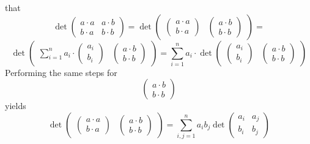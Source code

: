 \documentclass[color=black,11pt]{elegantpaper}
\begin{document}
that
$$
\det\left( \begin{array}{cc}
                                       a\cdot a & a\cdot b \\
                                       b\cdot a & b \cdot b
                                   \end{array}\right) =
 \det\left( \begin{array}{cc}
 \left( \begin{array}{c}
          a\cdot a\\
          b\cdot a
       \end{array} \right)  &
\left( \begin{array}{c}
          a\cdot b\\
          b\cdot b
       \end{array} \right)
                                   \end{array}\right) =
$$
$$
 \det\left( \begin{array}{cc}
\sum_{i=1}^n a_i \cdot
 \left( \begin{array}{c}
                a_i\\
                b_i
     \end{array} \right) &
\left( \begin{array}{c}
          a\cdot b\\
          b\cdot b
       \end{array} \right)
                                   \end{array}\right) = \sum_{i=1}^n a_i \cdot  \det\left( \begin{array}{cc}
 \left( \begin{array}{c}
                a_i\\
                b_i
     \end{array} \right) &
\left( \begin{array}{c}
          a\cdot b\\
          b\cdot b
       \end{array} \right)
                                   \end{array}\right)
$$
Performing the same steps for
$$
\left( \begin{array}{c}
          a\cdot b\\
          b\cdot b
       \end{array} \right)
$$
yields
$$
\det\left( \begin{array}{cc}
 \left( \begin{array}{c}
          a\cdot a\\
          b\cdot a
       \end{array} \right)  &
\left( \begin{array}{c}
          a\cdot b\\
          b\cdot b
       \end{array} \right)
                                   \end{array}\right) = \sum_{i,j=1}^n a_i b_j
 \det\left( \begin{array}{cc}
                                       a_i & a_j \\
                                       b_i & b_j
                                   \end{array}\right)
$$
\end{document}
